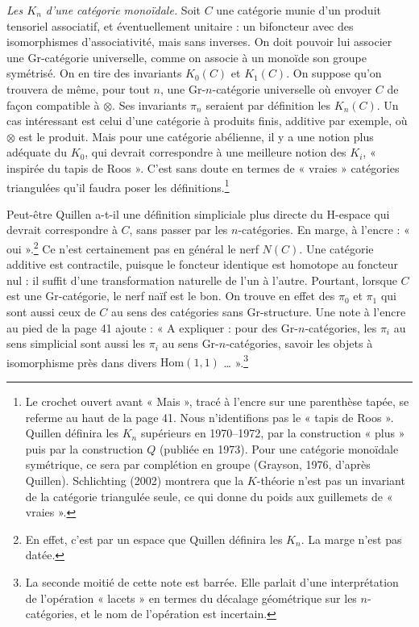 \documentclass[11pt,a4paper]{article}
\begin{document}
\emph{Les $K_n$ d'une catégorie monoïdale.} Soit $C$ une catégorie munie d'un
produit tensoriel associatif, et éventuellement unitaire : un bifoncteur avec
des isomorphismes d'associativité, mais sans inverses. On doit pouvoir lui
associer une Gr-catégorie universelle, comme on associe à un monoïde son
groupe symétrisé. On en tire des invariants $K_0(C)$ et $K_1(C)$. On suppose
qu'on trouvera de même, pour tout $n$, une Gr-$n$-catégorie universelle où
envoyer $C$ de façon compatible à $\otimes$. Ses invariants $\pi_n$ seraient
par définition les $K_n(C)$. Un cas intéressant est celui d'une catégorie à
produits finis, additive par exemple, où $\otimes$ est le produit. Mais pour
une catégorie abélienne, il y a une notion plus adéquate du $K_0$, qui devrait
correspondre à une meilleure notion des $K_i$, « inspirée du tapis de Roos ».
C'est sans doute en termes de « vraies » catégories triangulées qu'il faudra
poser les définitions.\footnote{Le crochet ouvert avant « Mais », tracé à
l'encre sur une parenthèse tapée, se referme au haut de la page 41. Nous
n'identifions pas le « tapis de Roos ». Quillen définira les $K_n$ supérieurs
en 1970--1972, par la construction « plus » puis par la construction $Q$
(publiée en 1973). Pour une catégorie monoïdale symétrique, ce sera par
complétion en groupe (Grayson, 1976, d'après Quillen). Schlichting (2002)
montrera que la $K$-théorie n'est pas un invariant de la catégorie
triangulée seule, ce qui donne du poids aux guillemets de « vraies ».}

Peut-être Quillen a-t-il une définition simpliciale plus directe du H-espace
qui devrait correspondre à $C$, sans passer par les $n$-catégories. En marge, à
l'encre : « oui ».\footnote{En effet, c'est par un espace que Quillen définira
les $K_n$. La marge n'est pas datée.} Ce n'est certainement pas en général le
nerf $N(C)$. Une catégorie additive est contractile, puisque le foncteur
identique est homotope au foncteur nul : il suffit d'une transformation
naturelle de l'un à l'autre. Pourtant, lorsque $C$ est une Gr-catégorie, le
nerf naïf est le bon. On trouve en effet des $\pi_0$ et $\pi_1$ qui sont aussi
ceux de $C$ au sens des catégories sans Gr-structure. Une note à l'encre au pied
de la page 41 ajoute : « A expliquer : pour des Gr-$n$-catégories, les $\pi_i$
au sens simplicial sont aussi les $\pi_i$ au sens Gr-$n$-catégories, savoir les
objets à isomorphisme près dans divers $\mathrm{Hom}(1,1)$ … ».\footnote{La
seconde moitié de cette note est barrée. Elle parlait d'une interprétation de
l'opération « lacets » en termes du décalage géométrique sur les
$n$-catégories, et le nom de l'opération est incertain.}
\end{document}
